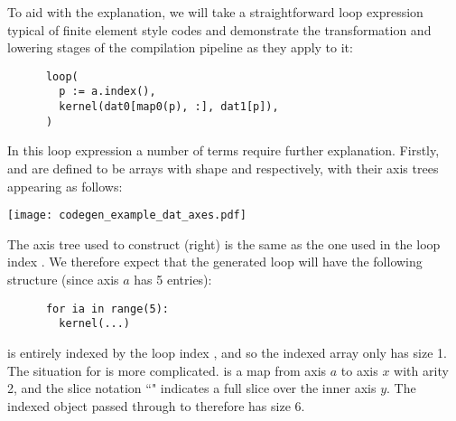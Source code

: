\documentclass[thesis]{subfiles}
\begin{document}


To aid with the explanation, we will take a straightforward loop expression typical of finite element style codes and demonstrate the transformation and lowering stages of the compilation pipeline as they apply to it:

\begin{center}
  \begin{minipage}{.38\textwidth}
    \begin{verbatim}
      loop(
        p := a.index(),
        kernel(dat0[map0(p), :], dat1[p]),
      )
    \end{verbatim}
  \end{minipage}
\end{center}

In this loop expression a number of terms require further explanation.
Firstly,  and  are defined to be arrays with shape  and  respectively, with their axis trees appearing as follows:

\begin{center}
  \texttt{[image: codegen\_example\_dat\_axes.pdf]}
\end{center}

The axis tree used to construct  (right) is the same as the one used in the loop index .
We therefore expect that the generated loop will have the following structure (since axis $a$ has 5 entries):

\begin{center}
  \begin{minipage}{.25\textwidth}
    \begin{verbatim}
      for ia in range(5):
        kernel(...)
    \end{verbatim}
  \end{minipage}
\end{center}

 is entirely indexed by the loop index , and so the indexed array  only has size 1.
The situation for  is more complicated.
 is a map from axis $a$ to axis $x$ with arity 2, and the slice notation ``\pycode{:}" indicates a full slice over the inner axis $y$.
The indexed object  passed through to  therefore has size 6.
\end{document}
